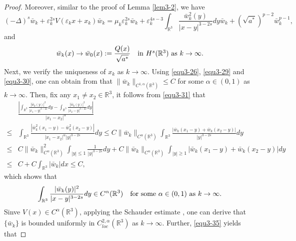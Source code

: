 \documentclass[reqno, 11pt]{amsart} %
\numberwithin{equation}{section}
\begin{document}
\begin{proof}
		Moreover, similar to the proof of Lemma \ref{lem3-2}, we have
		\begin{equation}\label{equ3-34}
			(-\Delta)^{s} \bar{w}_{k}+\varepsilon_{k}^{2s}V(\varepsilon_{k}x+x_{k})\bar{w}_{k}=\mu_{k}\varepsilon_{k}^{2s}\bar{w}_{k}+\varepsilon_{k}^{4s-3}\int_{\mathbb{R}^{3}}\frac{\bar{w}^{2}_{k}(y)}{|x-y|^{3-2s}}dy\bar{w}_{k}+(\sqrt{a^{\ast}})^{p-2}\bar{w}_{k}^{p-1},
		\end{equation}
		and
		\begin{equation}\label{equ3-35}
			\bar{w}_{k}(x)\rightarrow\bar{w}_{0}(x):=\frac{Q(x)}{\sqrt{a^{\ast}}}\quad \hbox{in $H^{s}(\mathbb{R}^{3})$ as $k\rightarrow\infty$}.
		\end{equation}
		Next, we verify the uniqueness of $x_{k}$ as $k\rightarrow\infty$. Using \eqref{equ3-26}, \eqref{equ3-29} and \eqref{equ3-30}, one can obtain from \cite[Proposition 2.9]{SS} that $\|\bar{w}_{k}\|_{C^{1, \alpha}(\mathbb{R}^{3})}\leq C$ for some $\alpha\in (0, 1)$ as $k\rightarrow\infty$. Then, fix any $x_{1}\neq x_{2}\in \mathbb{R}^{3}$, it follows from \eqref{equ3-31} that
		\begin{equation*}
			\begin{split}
				&\frac{\left| \int_{\mathbb{R}^{3}}\frac{|\bar{w}_{k}(y)|^{2}}{|x_{1}-y|^{3-2s}}dy-\int_{\mathbb{R}^{3}}\frac{|\bar{w}_{k}(y)|^{2}}{|x_{2}-y|^{3-2s}}dy\right|}{|x_{1}-x_{2}|^{\alpha}}\\
				\leq&\int_{\mathbb{R}^{3}}\frac{\left| \bar{w}^{2}_{k}(x_{1}-y)- \bar{w}^{2}_{k}(x_{2}-y)\right| }{|x_{1}-x_{2}|^{\alpha}|y|^{3-2s}}dy	\leq C\|\bar{w}_{k}\|_{C^{\alpha}(\mathbb{R}^{3})}\int_{\mathbb{R}^{3}}\frac{\left| \bar{w}_{k}(x_{1}-y)+\bar{w}_{k}(x_{2}-y)\right| }{|y|^{3-2s}}dy\\
				\leq&C\|\bar{w}_{k}\|^{2}_{C^{\alpha}(\mathbb{R}^{3})}\int_{|y|\leq1}\frac{1}{|y|^{3-2s}}dy+C\|\bar{w}_{k}\|_{C^{\alpha}(\mathbb{R}^{3})}\int_{|y|\geq1}\left|\bar{w}_{k}(x_{1}-y)+\bar{w}_{k}(x_{2}-y)\right|dy \\
				\leq& C+C\int_{\mathbb{R}^{3}}|\bar{w}_{k}|dx\leq C,
			\end{split}
		\end{equation*}
		which shows that
		\begin{equation*}
			\int_{\mathbb{R}^{3}}\frac{|\bar{w}_{k}(y)|^{2}}{|x-y|^{3-2s}}dy\in C^{\alpha}(\mathbb{R}^{3})\quad \hbox{for some $\alpha\in (0, 1)$ as $k\rightarrow\infty$}.
		\end{equation*}
		Sinve $V(x)\in C^{\alpha}(\mathbb{R}^{3})$, applying the
		Schauder estimate \cite[Theorem 2.11]{J}, one can derive that $\{\bar{w}_{k}\}$ is bounded uniformly in $C_{loc}^{2, \alpha}(\mathbb{R}^{3})$ as $k\rightarrow\infty$. Further, \eqref{equ3-35} yields that

\end{proof}
\end{document}
